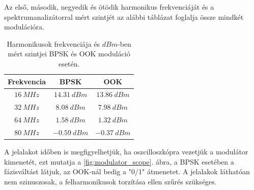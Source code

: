 Az első, második, negyedik és ötödik harmonikus frekvenciáját és a spektrumanalizátorral mért szintjét az alábbi táblázat foglalja össze mindkét modulációra.
%
\begin{table}[H]
	\centering
	\caption{Harmonikusok frekvenciája és $\si{dBm}$-ben mért szintjei BPSK és OOK moduláció esetén.}
	\label{table:kondi_geometria}
	\begin{tabular}{ | c | c | c |} 
		\hline
		\textbf{Frekvencia}&\textbf{BPSK}&\textbf{OOK}\\
		\hline
		$\SI{16}{MHz}$&$\SI{14.31}{dBm}$&$\SI{13.86}{dBm}$\\
		\hline
		$\SI{32}{MHz}$&$\SI{8.08}{dBm}$&$\SI{7.98}{dBm}$\\
		\hline
		$\SI{64}{MHz}$&$\SI{1.58}{dBm}$&$\SI{1.32}{dBm}$\\
		\hline
		$\SI{80}{MHz}$&$\SI{-0.59}{dBm}$&$\SI{-0.37}{dBm}$\\
		\hline
	\end{tabular}
\end{table}

A jelalakot időben is megfigyelhetjük, ha oszcilloszkópra vezetjük a modulátor kimenetét, ezt mutatja a \ref{fig:modulator_scope}. ábra, a BPSK esetében a fázisváltást látjuk, az OOK-nál bedig a "0/1" átmenetet. A jelalakok láthatóan nem szinuszosak, a felharmonikusok torzítása ellen szűrés szükséges.

